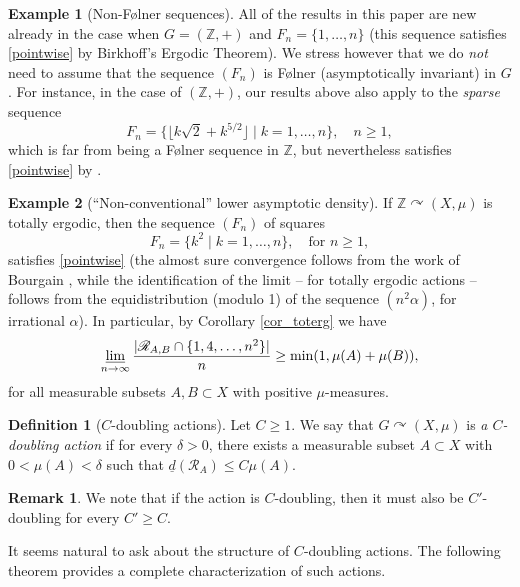 \documentclass[JEP,XML,SOM,Unicode]{cedram}
\let\mathcal\mathscr
\newcommand{\cR}{\mathcal{R}}
\newcommand{\bZ}{\mathbb{Z}}
\let\acts\curvearrowright
\theoremstyle{plain}
\theoremstyle{definition}
\newtheorem{definition}[theorem]{Definition}
\newtheorem{remark}[theorem]{Remark}
\newtheorem{example}{Example}[section]
\begin{document}
\begin{example}[Non-F\o lner sequences]
All of the results in this paper are new already in the case when $G = (\bZ,+)$ and $F_n = \{1,\ldots,n\}$ (this sequence satisfies \eqref{pointwise} by Birkhoff's Ergodic Theorem). We stress however that
we do \emph{not} need to assume that the sequence $(F_n)$ is F\o lner (asymptotically invariant) in $G$. For instance, in the case of $(\bZ,+)$, our results above also apply to the \emph{sparse} sequence
\[
F_n = \bigl\{ \lfloor k \sqrt{2} + k^{5/2} \rfloor \mid  k = 1,\ldots,n \bigr\}, \quad \textrm{$n \geq 1$},
\]
which is far from being a F\o lner sequence in $\bZ$, but nevertheless satisfies \eqref{pointwise} by \cite{BW}.
\end{example}

\begin{example}[``Non-conventional'' lower asymptotic density]
If $\bZ \acts (X,\mu)$ is totally ergodic, then the sequence $(F_n)$ of squares
\[
F_n = \{ k^2 \mid k = 1,\ldots,n\}, \quad \textrm{for $n \geq 1$},
\]
satisfies \eqref{pointwise} (the almost sure convergence follows from the work of Bourgain \cite{Bo88}, while the identification of the limit -- for totally ergodic actions -- follows from the equidistribution (modulo 1) of the sequence $(n^2 \alpha)$, for irrational $\alpha$). In particular, by Corollary \ref{cor_toterg} we have
\[
\varliminf_{n \to \infty} \frac{|\cR_{A,B} \cap \{1,4,\ldots,n^2\}|}{n} \geq \min(1,\mu(A) + \mu(B)),
\]
for all measurable subsets $A, B \subset X$ with positive $\mu$-measures.
\end{example}


\begin{definition}[$C$\nobreakdash-doubling actions]
Let $C \geq 1$. We say that $G \acts (X,\mu)$ is \emph{a $C$\nobreakdash-doubling action} if for every $\delta > 0$, there
exists a measurable subset $A \subset X$ with $0 < \mu(A) < \delta$ such that $\underline{d}(\cR_A) \leq C\mu(A)$.
\end{definition}

\begin{remark}
We note that if the action is $C$\nobreakdash-doubling, then it must also be $C'$\nobreakdash-doubling for every $C' \geq C$.
\end{remark}

It seems natural to ask about the structure of $C$\nobreakdash-doubling actions. The following theorem provides a complete
characterization of such actions.
\end{document}
